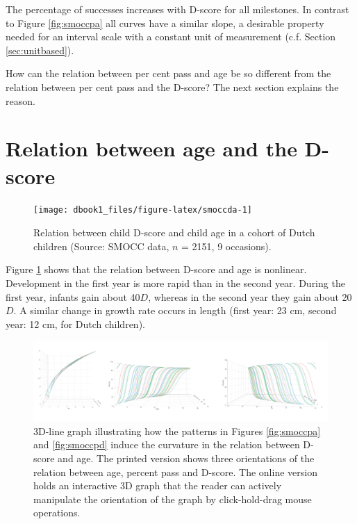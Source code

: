 \documentclass[
]{book}
\begin{document}
The percentage of successes increases with D-score for all milestones. In contrast to Figure \ref{fig:smoccpa} all curves have a similar slope, a desirable property needed for an interval scale with a constant unit of measurement (c.f. Section \ref{sec:unitbased}).

How can the relation between per cent pass and age be so different from the relation between per cent pass and the D-score? The next section explains the reason.

\hypertarget{sec:aged}{%
\section{Relation between age and the D-score}\label{sec:aged}}

\begin{figure}

{\centering \texttt{[image: dbook1\_files/figure-latex/smoccda-1]} 

}

\caption{Relation between child D-score and child age in a cohort of Dutch children (Source: SMOCC data, \(n\) = 2151, 9 occasions).}\label{fig:smoccda}
\end{figure}



Figure \ref{fig:smoccda} shows that the relation between D-score and age is nonlinear. Development in the first year is more rapid than in the second year. During the first year, infants gain about 40\(D\), whereas in the second year they gain about 20\(D\). A similar change in growth rate occurs in length (first year: 23 cm, second year: 12 cm, for Dutch children).

\begin{figure}

{\centering \includegraphics[width=1\linewidth]{fig/scenes} 

}

\caption{3D-line graph illustrating how the patterns in Figures \ref{fig:smoccpa} and \ref{fig:smoccpd} induce the curvature in the relation between D-score and age. The printed version shows three orientations of the relation between age, percent pass and D-score. The online version holds an interactive 3D graph that the reader can actively manipulate the orientation of the graph by click-hold-drag mouse operations.}\label{fig:smoccdap}
\end{figure}
\end{document}
